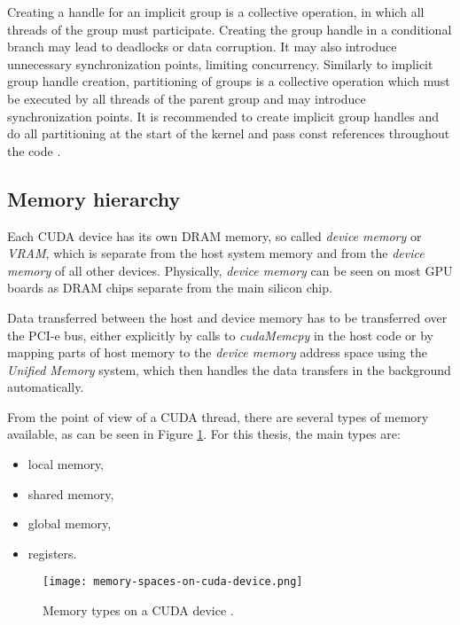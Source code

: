 

Creating a handle for an implicit group is a collective operation, in which all threads of the group must participate. Creating the group handle in a conditional branch may lead to deadlocks or data corruption. It may also introduce unnecessary synchronization points, limiting concurrency. Similarly to implicit group handle creation, partitioning of groups is a collective operation which must be executed by all threads of the parent group and may introduce synchronization points. It is recommended to create implicit group handles and do all partitioning at the start of the kernel and pass const references throughout the code \cite{site:cuda}.

\subsection{Memory hierarchy}
\label{sec:memory_hierarchy}

Each CUDA device has its own DRAM memory, so called \textit{device memory} or \textit{VRAM}, which is separate from the host system memory and from the \textit{device memory} of all other devices. Physically, \textit{device memory} can be seen on most GPU boards as DRAM chips separate from the main silicon chip.

Data transferred between the host and device memory has to be transferred over the PCI-e bus, either explicitly by calls to \textit{cudaMemcpy} in the host code or by mapping parts of host memory to the \textit{device memory} address space using the \textit{Unified Memory} system, which then handles the data transfers in the background automatically.

From the point of view of a CUDA thread, there are several types of memory available, as can be seen in Figure \ref{fig:memory_types}. For this thesis, the main types are:

\begin{itemize}
	\item local memory,
	\item shared memory,
	\item global memory,
	\item registers.
\end{itemize}

\begin{figure}[h]
	\centering
	\texttt{[image: memory-spaces-on-cuda-device.png]}
	\caption{Memory types on a CUDA device \citep{site:cuda}.}
	\label{fig:memory_types}
\end{figure}


